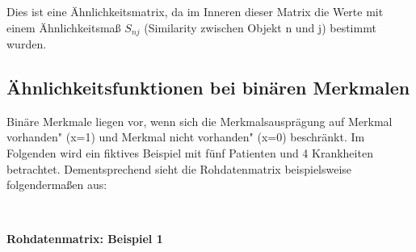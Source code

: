 \documentclass[12pt,titlepage]{article}
\begin{document}
Dies ist eine Ähnlichkeitsmatrix, da im Inneren dieser Matrix die Werte mit einem Ähnlichkeitsmaß $S_{nj}$ (Similarity zwischen Objekt n und j) bestimmt wurden.



		\subsection{Ähnlichkeitsfunktionen bei binären Merkmalen}
			Binäre Merkmale liegen vor, wenn sich die Merkmalsausprägung auf \glqq Merkmal vorhanden"  (x=1) und \glqq Merkmal nicht vorhanden"  (x=0) beschränkt. Im Folgenden wird ein fiktives Beispiel mit fünf Patienten und 4 Krankheiten betrachtet. Dementsprechend sieht die Rohdatenmatrix beispielsweise folgendermaßen aus: \\


\centerline{ \\
}
\centerline{\textbf{Rohdatenmatrix: Beispiel 1}}
\centerline{}
\end{document}
